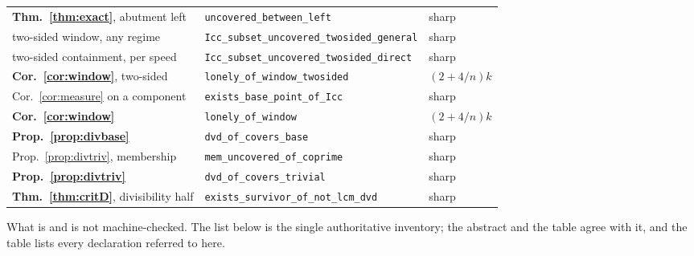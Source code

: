 \documentclass[11pt]{amsart}
\theoremstyle{plain}
\theoremstyle{definition}
\begin{document}
\begin{center}
\begin{tabular}{lll}
\textbf{Thm.~\ref{thm:exact}}, abutment left & \texttt{uncovered\_between\_left} & sharp \\
two-sided window, any regime & \texttt{Icc\_subset\_uncovered\_twosided\_general} & sharp \\
two-sided containment, per speed & \texttt{Icc\_subset\_uncovered\_twosided\_direct} & sharp \\
\textbf{Cor.~\ref{cor:window}}, two-sided & \texttt{lonely\_of\_window\_twosided} & $(2{+}4/n)k$ \\
Cor.~\ref{cor:measure} on a component & \texttt{exists\_base\_point\_of\_Icc} & sharp \\
\textbf{Cor.~\ref{cor:window}} & \texttt{lonely\_of\_window} & $(2{+}4/n)k$ \\
\textbf{Prop.~\ref{prop:divbase}} & \texttt{dvd\_of\_covers\_base} & sharp \\
Prop.~\ref{prop:divtriv}, membership & \texttt{mem\_uncovered\_of\_coprime} & sharp \\
\textbf{Prop.~\ref{prop:divtriv}} & \texttt{dvd\_of\_covers\_trivial} & sharp \\
\textbf{Thm.~\ref{thm:critD}}, divisibility half & \texttt{exists\_survivor\_of\_not\_lcm\_dvd} & sharp \\
\hline
\end{tabular}
\end{center}

What is and is not machine-checked. The list below is the single authoritative inventory; the
abstract and the table agree with it, and the table lists every declaration referred to here.
\end{document}
